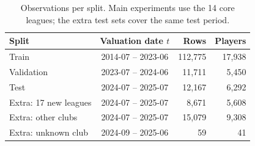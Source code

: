 \begin{table}[!h]
\centering
\caption{Observations per split. Main experiments use the 14 core leagues; the extra test sets cover the same test period.}
\label{tab:data}
\footnotesize
\begin{tabular}{lcrr}
\toprule
Split & Valuation date $t$ & Rows & Players \\
\midrule
Train & 2014-07 -- 2023-06 & 112{,}775 & 17{,}938 \\
Validation & 2023-07 -- 2024-06 & 11{,}711 & 5{,}450 \\
Test & 2024-07 -- 2025-07 & 12{,}167 & 6{,}292 \\
Extra: 17 new leagues & 2024-07 -- 2025-07 & 8{,}671 & 5{,}608 \\
Extra: other clubs & 2024-07 -- 2025-07 & 15{,}079 & 9{,}308 \\
Extra: unknown club & 2024-09 -- 2025-06 & 59 & 41 \\
\bottomrule
\end{tabular}
\end{table}
